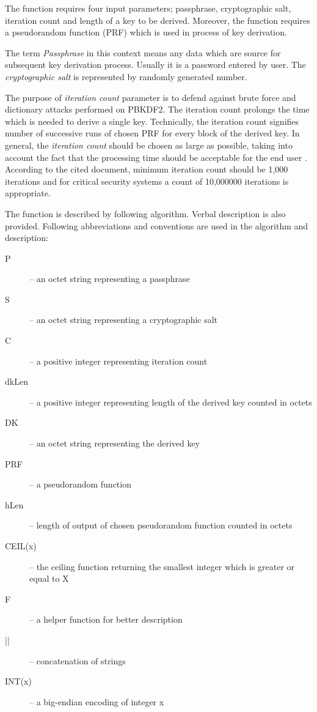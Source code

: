 \documentclass[nolof]{fithesis3}
\begin{document}
The function requires four input parameters; passphrase, cryptographic salt, iteration count and length of a key to be derived. Moreover, the function requires a pseudorandom function (PRF) which is used in process of key derivation.

The term \emph{Passphrase} in this context means any data which are source for subsequent key derivation process. Usually it is a password entered by user. The \emph{cryptographic salt} is represented by randomly generated number.

The purpose of \emph{iteration count} parameter is to defend against brute force and dictionary attacks performed on PBKDF2. The iteration count prolongs the time which is needed to derive a single key. Technically, the iteration count signifies number of successive runs of chosen PRF for every block of the derived key. In general, the \emph{iteration count} should be chosen as large as possible, taking into account the fact that the processing time should be acceptable for the end user \parencite{nistpbkdf2}. According to the cited document, minimum iteration count should be 1,000 iterations and for critical security systems a count of 10,000000 iterations is appropriate. 

The function is described by following algorithm. Verbal description is also provided. Following abbreviations and conventions are used in the algorithm and description:

\begin{description}
\item[P] -- an octet string representing a passphrase

\item[S] -- an octet string representing a cryptographic salt

\item[C] -- a positive integer representing iteration count

\item[dkLen] -- a positive integer representing length of the derived key counted in octets

\item[DK] -- an octet string representing the derived key

\item[PRF] -- a pseudorandom function

\item[hLen] -- length of output of chosen pseudorandom function counted in octets

\item[CEIL(x)] -- the ceiling function returning the smallest integer which is greater or equal to X

\item[F] -- a helper function for better description

\item[||] -- concatenation of strings

\item[INT(x)] -- a big-endian encoding of integer x
\end{description}
\end{document}
